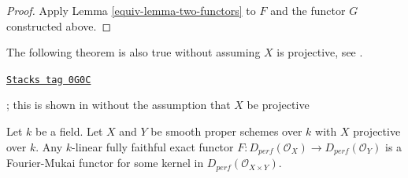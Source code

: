 \begin{proof}

Apply Lemma \ref{equiv-lemma-two-functors} to $F$ and the functor
$G$ constructed above.
\end{proof}

The following theorem is also true without assuming $X$ is projective,
see \cite{Noah}.

\begin{theorem}[Orlov]

\label{equiv-theorem-fully-faithful}
\href{https://stacks.math.columbia.edu/tag/0G0C}{\texttt{Stacks tag 0G0C}}

\begin{reference}
\cite[Theorem 2.2]{Orlov-K3}; this is shown in \cite{Noah}
without the assumption that $X$ be projective
\end{reference}
Let $k$ be a field. Let $X$ and $Y$ be smooth proper schemes over $k$
with $X$ projective over $k$. Any $k$-linear fully faithful exact
functor $F : D_{perf}(\mathcal{O}_X) \to D_{perf}(\mathcal{O}_Y)$
is a Fourier-Mukai functor for some kernel in
$D_{perf}(\mathcal{O}_{X \times Y})$.
\end{theorem}


